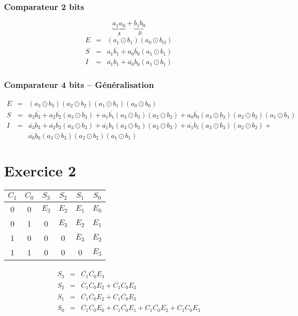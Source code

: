 \documentclass[12pt,a4paper,openany]{book}
\begin{document}
	\subsubsection{Comparateur 2 bits}%
	$$ \underbrace{a_1a_0}_A + \underbrace{b_1b_0}_B$$
	\begin{eqnarray*}
		E &=&  (a_1 \odot b_1)(a_0 \odot b_O)\\
		S &=&  a_1 \overline{b_1} + a_0\overline{b_0}(a_1 \odot b_1)\\
		I &=& \overline{a_1}b_1 + \overline{a_0}b_0(a_1 \odot b_1)
	\end{eqnarray*}
	\subsubsection{Comparateur 4 bits -- Généralisation}
	\begin{eqnarray*}
		E &=&  (a_3 \odot b_3)(a_2 \odot b_2)(a_1 \odot b_1)(a_0 \odot b_0)\\
		S &=& a_3\overline{b_3}+a_2\overline{b_2}(a_3 \odot b_3) + a_1 \overline{b_1} (a_3 \odot b_3)(a_2 \odot b_2) + a_0
		\overline{b_0}(a_3\odot b_3)(a_2\odot b_2)(a_1 \odot b_1)\\
		I &=&  \overline{a_3}b_3 + \overline{a_2}b_2(a_3 \odot b_3) + \overline{a_1} b_1 (a_3 \odot b_3)(a_2 \odot b_3) +
		\overline{a_1}b_1 (a_3 \odot b_3)(a_2 \odot b_2) +\\&& \overline{a_0}b_0 (a_3 \odot b_3)(a_2 \odot b_2)(a_1 \odot b_1)
	\end{eqnarray*}

	\section{Exercice 2}
	\begin{tabular}{cc||cccc}
		$C_1$&$C_0$&$S_3$&$S_2$&$S_1$&$S_0$\\
		\hline
		0&0&$E_3$&$E_2$&$E_1$&$E_0$\\
		0&1&0&$E_3$&$E_2$&$E_1$\\
		1&0&0&0&$E_3$&$E_2$\\
		1&1&0&0&0&$E_3$
	\end{tabular}
	\begin{eqnarray*}
		S_3 &=&  \overline{C_1}\overline{C_0}E_3\\
		S_2 &=&  \overline C_1 \overline C_0 E_2 + \overline{C_1} C_0 E_3\\
		S_1 &=&  \overline{C_1} \overline{C_0}E_2 + C_1\overline{C_0}E_3\\
		S_0 &=& \overline{C_1} \overline{C_0}E_0 + C_1 \overline{C_0}E_1+C_1\overline{C_0}E_2 + C_1C_0E_3
	\end{eqnarray*}
\end{document}
